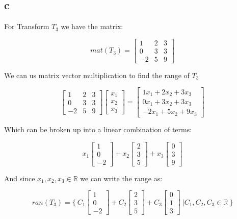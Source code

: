 \documentclass[12pt]{article}
\begin{document}
\subsection*{c}

For Transform $T_{3}$ we have the matrix:

\[
mat(T_{3}) =
\begin{bmatrix}
1 & 2 & 3\\
0 & 3 & 3\\
-2 & 5 & 9
\end{bmatrix}
\]

We can us matrix vector multiplication to find the range of $T_{3}$

\[
\begin{bmatrix}
1 & 2 & 3\\
0 & 3 & 3\\
-2 & 5 & 9
\end{bmatrix}
\begin{bmatrix}
x_{1}\\
x_{2}\\
x_{3}
\end{bmatrix}
=
\begin{bmatrix}
1x_{1} + 2x_{2} + 3x_{3}\\
0x_{1} + 3x_{2} + 3x_{3}\\
-2x_{1}+ 5x_{2} + 9x_{3}
\end{bmatrix}
\]

Which can be broken up into a linear combination of terms:

\[
x_{1}
\begin{bmatrix}
1\\
0\\
-2
\end{bmatrix}
+
x_{2}
\begin{bmatrix}
2\\
3\\
5
\end{bmatrix}
+
x_{3}
\begin{bmatrix}
0\\
3\\
9
\end{bmatrix}
\]

And since $x_{1}, x_{2}, x_{3} \in \mathbb{R} $ we can write the range as:

\[
ran(T_{3}) =
\{ \
C_{1}
\begin{bmatrix}
1\\
0\\
-2
\end{bmatrix}
+
C_{2}
\begin{bmatrix}
2\\
3\\
5
\end{bmatrix}
+
C_{3}
\begin{bmatrix}
0\\
1\\
3
\end{bmatrix}
\ |
C_{1}, C_{2}, C_{3} \in \mathbb{R} \ \}
\]
\end{document}
